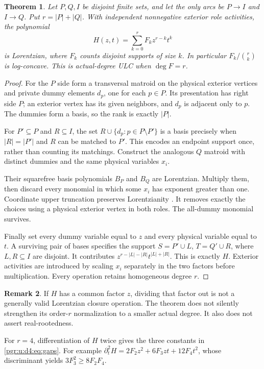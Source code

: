 \documentclass[11pt]{article}
\numberwithin{equation}{section}
\newtheorem{theorem}{Theorem}[section]\newtheorem{lemma}[theorem]{Lemma}\newtheorem{proposition}[theorem]{Proposition}\newtheorem{corollary}[theorem]{Corollary}
\theoremstyle{definition}\newtheorem{definition}[theorem]{Definition}\newtheorem{remark}[theorem]{Remark}
\begin{document}
\begin{theorem}\label{pgr:u:d4:thm:exterior}
Let $P,Q,I$ be disjoint finite sets, and let the only arcs be $P\to I$ and $I\to Q$. Put $r=|P|+|Q|$. With independent nonnegative exterior role activities, the polynomial
\[
 H(z,t)=\sum_{k=0}^r F_k z^{r-k}t^k
\]
is Lorentzian, where $F_k$ counts disjoint supports of size $k$. In particular $F_k/\binom rk$ is log-concave. This is actual-degree ULC when $\deg F=r$.
\end{theorem}
\begin{proof}
For the $P$ side form a transversal matroid on the physical exterior vertices and private dummy elements $d_p$, one for each $p\in P$. Its presentation has right side $P$; an exterior vertex has its given neighbors, and $d_p$ is adjacent only to $p$. The dummies form a basis, so the rank is exactly $|P|$.

For $P'\subseteq P$ and $R\subseteq I$, the set
$R\cup\{d_p:p\in P\setminus P'\}$ is a basis precisely when $|R|=|P'|$ and $R$ can be matched to $P'$. This encodes an endpoint support once, rather than counting its matchings. Construct the analogous $Q$ matroid with distinct dummies and the same physical variables $x_i$.

Their squarefree basis polynomials $B_P$ and $B_Q$ are Lorentzian. Multiply them, then discard every monomial in which some $x_i$ has exponent greater than one. Coordinate upper truncation preserves Lorentzianity \cite[Proposition 3.3]{RSW}. It removes exactly the choices using a physical exterior vertex in both roles. The all-dummy monomial survives.

Finally set every dummy variable equal to $z$ and every physical variable equal to $t$. A surviving pair of bases specifies the support
$S=P'\cup L$, $T=Q'\cup R$, where $L,R\subseteq I$ are disjoint. It contributes $z^{r-|L|-|R|}t^{|L|+|R|}$. This is exactly $H$. Exterior activities are introduced by scaling $x_i$ separately in the two factors before multiplication. Every operation retains homogeneous degree $r$.
\end{proof}
\begin{remark}
If $H$ has a common factor $z$, dividing that factor out is not a generally valid Lorentzian closure operation. The theorem does not silently strengthen its order-$r$ normalization to a smaller actual degree. It also does not assert real-rootedness.
\end{remark}
For $r=4$, differentiation of $H$ twice gives the three constants in \eqref{pgr:u:d4:eq:gaps}. For example $\partial_t^2H=2F_2z^2+6F_3zt+12F_4t^2$, whose discriminant yields $3F_3^2\ge8F_2F_4$.
\end{document}
